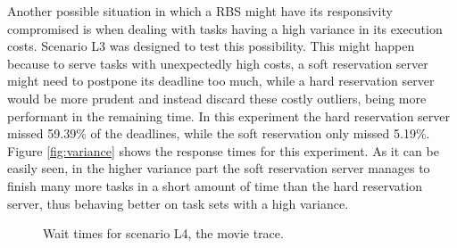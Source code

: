 \documentclass[times, 10pt,twocolumn]{article}
\begin{document}
Another possible situation in which a RBS might have its responsivity
compromised is when dealing with tasks having a high variance in its
execution costs. Scenario L3 was designed to test this
possibility. This might happen because to serve tasks with
unexpectedly high costs, a soft reservation server might need to
postpone its deadline too much, while a hard reservation server would
be more prudent and instead discard these costly outliers, being more
performant in the remaining time. In this experiment the hard
reservation server missed 59.39\% of the deadlines, while the soft
reservation only missed 5.19\%. Figure \ref{fig:variance} shows the
response times for this experiment. As it can be easily seen, in the
higher variance part the soft reservation server manages to finish
many more tasks in a short amount of time than the hard reservation
server, thus behaving better on task sets with a high variance.

\begin{figure}[t]
  \centering
  \caption{Wait times for scenario L4, the movie trace.}
  \label{fig:eve}
\end{figure}
\end{document}
